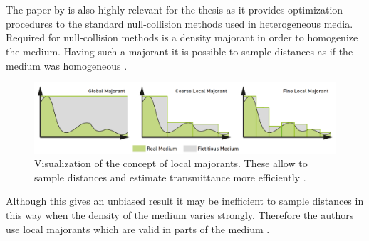 \section{}
The paper  by \citeauthor{brick_grid} is also highly relevant for the thesis as it provides optimization procedures to the standard null-collision methods used in heterogeneous media.
Required for null-collision methods is a density majorant in order to homogenize the medium.
Having such a majorant it is possible to sample distances as if the medium was homogeneous \cite[p. 3]{brick_grid}.
\begin{figure}[!ht]
    \centering
    \includegraphics[width=0.9\linewidth]{img/brick_grid_majorants.png}
    \caption{Visualization of the concept of local majorants. These allow to sample distances and estimate transmittance more efficiently \cite[p. 3]{brick_grid}.}
    \label{fig:brick_grid_datastructure}
\end{figure}
Although this gives an unbiased result it may be inefficient to sample distances in this way when the density of the medium varies strongly.
Therefore the authors use local majorants which are valid in parts of the medium \cite[p. 3]{brick_grid}.

